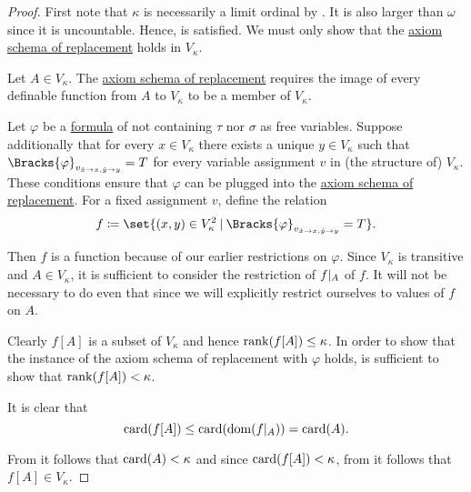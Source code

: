 \begin{proof}
  First note that \( \kappa \) is necessarily a limit ordinal by . It is also larger than \( \omega \) since it is uncountable. Hence,  is satisfied. We must only show that the \hyperref[def:zfc/replacement]{axiom schema of replacement} holds in \( V_\kappa \).

  Let \( A \in V_\kappa \). The \hyperref[def:zfc/replacement]{axiom schema of replacement} requires the image of every definable function from \( A \) to \( V_\kappa \) to be a member of \( V_\kappa \).

  Let \( \varphi \) be a \hyperref[def:first_order_syntax/formula]{formula} of \hyperref[def:zfc]{} not containing \( \tau \) nor \( \sigma \) as free variables. Suppose additionally that for every \( x \in V_\kappa \) there exists a unique \( y \in V_\kappa \) such that \( \Bracks{\varphi}_{v_{\synx \to x, \syny \to y}} = T \) for every variable assignment \( v \) in (the structure of) \( V_\kappa \). These conditions ensure that \( \varphi \) can be plugged into the \hyperref[def:zfc/replacement]{axiom schema of replacement}. For a fixed assignment \( v \), define the relation
  \begin{equation*}
    f \coloneqq \set{ (x, y) \in V_\kappa^2 \given \Bracks{\varphi}_{v_{\synx \to x, \syny \to y}} = T }.
  \end{equation*}

  Then \( f \) is a function because of our earlier restrictions on \( \varphi \). Since \( V_\kappa \) is transitive and \( A \in V_\kappa \), it is sufficient to consider the restriction of \( f\vert_A \) of \( f \). It will not be necessary to do even that since we will explicitly restrict ourselves to values of \( f \) on \( A \).

  Clearly \( f[A] \) is a subset of \( V_\kappa \) and hence \( \operatorname{rank}(f[A]) \leq \kappa \). In order to show that the instance of the axiom schema of replacement with \( \varphi \) holds, is sufficient to show that \( \operatorname{rank}(f[A]) < \kappa \).

  It is clear that
  \begin{equation*}
    \operatorname{card}(f[A]) \leq \operatorname{card}(\operatorname{dom}(f\vert_A)) = \operatorname{card}(A).
  \end{equation*}

  From  it follows that \( \operatorname{card}(A) < \kappa \) and since \( \operatorname{card}(f[A]) < \kappa \), from  it follows that \( f[A] \in V_\kappa \).
\end{proof}

